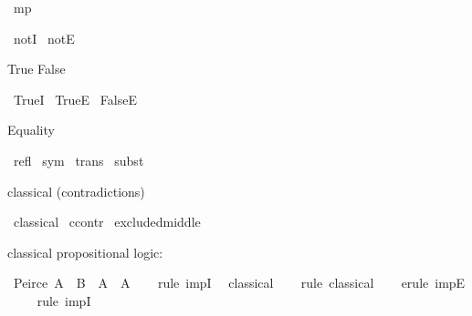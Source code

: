 \begin{isabellebody}
{}%
\endisatagproof
{\isafoldproof}%
%
\isadelimproof
%
\endisadelimproof
%
\begin{isamarkuptext}%
\isa{{\isasymlongrightarrow}}%
\end{isamarkuptext}\isamarkuptrue%
\isamarkupfalse%
\ mp%
\begin{isamarkuptext}%
\isa{{\isasymnot}}%
\end{isamarkuptext}\isamarkuptrue%
\isamarkupfalse%
\ notI\isanewline
{}\isamarkupfalse%
\ notE%
\begin{isamarkuptext}%
True \isa{{\isacharampersand}{\kern0pt}} False%
\end{isamarkuptext}\isamarkuptrue%
\isamarkupfalse%
\ TrueI\isanewline
{}\isamarkupfalse%
\ TrueE\isanewline
{}\isamarkupfalse%
\ FalseE%
\begin{isamarkuptext}%
Equality%
\end{isamarkuptext}\isamarkuptrue%
\isamarkupfalse%
\ refl\isanewline
{}\isamarkupfalse%
\ sym\isanewline
{}\isamarkupfalse%
\ trans\isanewline
{}\isamarkupfalse%
\ subst%
\begin{isamarkuptext}%
classical (contradictions)%
\end{isamarkuptext}\isamarkuptrue%
\isamarkupfalse%
\ classical\isanewline
{}\isamarkupfalse%
\ ccontr\isanewline
{}\isamarkupfalse%
\ excluded{\isacharunderscore}{\kern0pt}middle%
\begin{isamarkuptext}%
classical propositional logic:%
\end{isamarkuptext}\isamarkuptrue%
\isamarkupfalse%
\ Peirce{\isacharcolon}{\kern0pt}\ {\isachardoublequoteopen}{\isacharparenleft}{\kern0pt}{\isacharparenleft}{\kern0pt}A\ {\isasymlongrightarrow}\ B{\isacharparenright}{\kern0pt}\ {\isasymlongrightarrow}\ A{\isacharparenright}{\kern0pt}\ {\isasymlongrightarrow}\ A{\isachardoublequoteclose}\isanewline
%
\isadelimproof
\ \ %
\endisadelimproof
%
\isatagproof
{}\isamarkupfalse%
\ {\isacharparenleft}{\kern0pt}rule\ impI{\isacharparenright}{\kern0pt}\ \isamarkupfalse%
\ classical\isanewline
\ \ \isamarkupfalse%
\ {\isacharparenleft}{\kern0pt}rule\ classical{\isacharparenright}{\kern0pt}\isanewline
\ \ \isamarkupfalse%
\ {\isacharparenleft}{\kern0pt}erule\ impE{\isacharparenright}{\kern0pt}\isanewline
\ \ \ \isamarkupfalse%
\ {\isacharparenleft}{\kern0pt}rule\ impI{\isacharparenright}{\kern0pt}\isanewline

\end{isabellebody}
